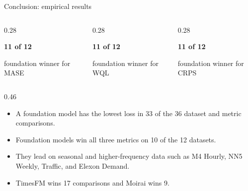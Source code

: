 \documentclass[aspectratio=169,10pt]{beamer}
\newcommand{\tagbox}[2]{%
  \tikz[baseline=(tag.base)]{%
    \node[fill=#1,rounded corners=1.5pt,inner xsep=4pt,inner ysep=3pt]
      (tag) {\strut #2};
  }%
}
\begin{document}
\begin{frame}{Conclusion: empirical results}
  \vspace{0.04cm}
  \begin{columns}[T,totalwidth=0.92\linewidth]
    \begin{column}{0.28\linewidth}
      \colorbox{TealLight}{\parbox{0.90\linewidth}{\centering
        \fontsize{15}{17}\selectfont\bfseries 11 of 12\par
        \scriptsize foundation winner for MASE}}
    \end{column}
    \begin{column}{0.28\linewidth}
      \colorbox{PurpleLight}{\parbox{0.90\linewidth}{\centering
        \fontsize{15}{17}\selectfont\bfseries 11 of 12\par
        \scriptsize foundation winner for WQL}}
    \end{column}
    \begin{column}{0.28\linewidth}
      \colorbox{GreenLight}{\parbox{0.90\linewidth}{\centering
        \fontsize{15}{17}\selectfont\bfseries 11 of 12\par
        \scriptsize foundation winner for CRPS}}
    \end{column}
  \end{columns}

  \vspace{0.20cm}
  \begin{columns}[T,totalwidth=0.93\linewidth]
    \begin{column}{0.46\linewidth}
      \tagbox{PurpleLight}{\textbf{Main pattern}}
      \vspace{0.10cm}

      \fontsize{8.4}{9.8}\selectfont
      \begin{itemize}\setlength{\itemsep}{0.10cm}
        \item A foundation model has the lowest loss in 33 of the 36
          dataset and metric comparisons.
        \item Foundation models win all three metrics on 10 of the 12
          datasets.
        \item They lead on seasonal and higher-frequency data such as M4
          Hourly, NN5 Weekly, Traffic, and Elexon Demand.
        \item TimesFM wins 17 comparisons and Moirai wins 9.
      \end{itemize}
    \end{column}


\end{columns}
\end{frame}
\end{document}
